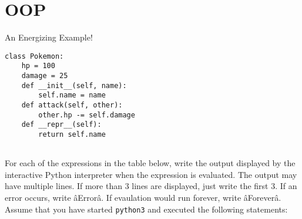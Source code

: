 \documentclass{exam}
\begin{document}
\section{OOP}
\begin{questions}
\item An Energizing Example!
\begin{lstlisting}
class Pokemon:
    hp = 100
    damage = 25
    def __init__(self, name):
        self.name = name
    def attack(self, other):
        other.hp -= self.damage
    def __repr__(self):
        return self.name
 
\end{lstlisting}
For each of the expressions in the table below, write the output displayed by the interactive Python interpreter when the expression is evaluated. The output may have multiple lines. If more than 3 lines are displayed, just write the first 3. If an error occurs, write âErrorâ. If evaulation would run forever, write âForeverâ.\\
Assume that you have started \texttt{python3} and executed the following statements:


\end{questions}
\end{document}
